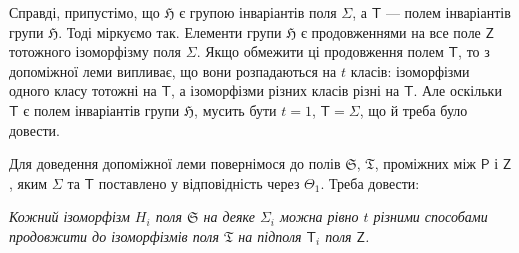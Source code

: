\documentclass[11pt]{article}
\begin{document}
Справді, припустімо, що \(\mathfrak H\) є групою інваріантів поля \(\Sigma\), а \(\mathsf T\) --- полем інваріантів групи \(\mathfrak H\). Тоді міркуємо так. Елементи групи \(\mathfrak H\) є продовженнями на все поле \(\mathsf Z\) тотожного ізоморфізму поля \(\Sigma\). Якщо обмежити ці продовження полем \(\mathsf T\), то з допоміжної леми випливає, що вони розпадаються на \(t\) класів: ізоморфізми одного класу тотожні на \(\mathsf T\), а ізоморфізми різних класів різні на \(\mathsf T\). Але оскільки \(\mathsf T\) є полем інваріантів групи \(\mathfrak H\), мусить бути \(t=1\), \(\mathsf T=\Sigma\), що й треба було довести.

Для доведення допоміжної леми повернімося до полів \(\mathfrak S\), \(\mathfrak T\), проміжних між \(\mathsf P\) і \(\mathsf Z\), яким \(\Sigma\) та \(\mathsf T\) поставлено у відповідність через \(\Theta_1\). Треба довести:

\emph{Кожний ізоморфізм \(H_i\) поля \(\mathfrak S\) на деяке \(\Sigma_i\) можна рівно \(t\) різними способами продовжити до ізоморфізмів поля \(\mathfrak T\) на підполя \(\mathsf T_i\) поля \(\mathsf Z\).}
\end{document}
